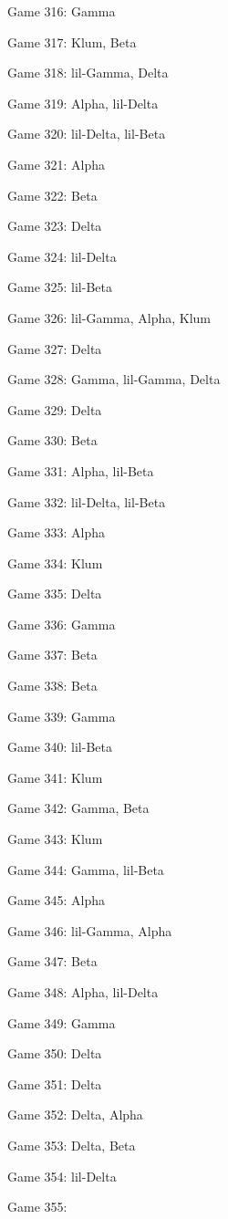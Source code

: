 \documentclass{article}
\begin{document}
\begin{multicols}{3}
\begin{compactitem}
\item Game 316:
Gamma
\item Game 317:
Klum, Beta
\item Game 318:
lil-Gamma, Delta
\item Game 319:
Alpha, lil-Delta
\item Game 320:
lil-Delta, lil-Beta
\item Game 321:
Alpha
\item Game 322:
Beta
\item Game 323:
Delta
\item Game 324:
lil-Delta
\item Game 325:
lil-Beta
\item Game 326:
lil-Gamma, Alpha, Klum
\item Game 327:
Delta
\item Game 328:
Gamma, lil-Gamma, Delta
\item Game 329:
Delta
\item Game 330:
Beta
\item Game 331:
Alpha, lil-Beta
\item Game 332:
lil-Delta, lil-Beta
\item Game 333:
Alpha
\item Game 334:
Klum
\item Game 335:
Delta
\item Game 336:
Gamma
\item Game 337:
Beta
\item Game 338:
Beta
\item Game 339:
Gamma
\item Game 340:
lil-Beta
\item Game 341:
Klum
\item Game 342:
Gamma, Beta
\item Game 343:
Klum
\item Game 344:
Gamma, lil-Beta
\item Game 345:
Alpha
\item Game 346:
lil-Gamma, Alpha
\item Game 347:
Beta
\item Game 348:
Alpha, lil-Delta
\item Game 349:
Gamma
\item Game 350:
Delta
\item Game 351:
Delta
\item Game 352:
Delta, Alpha
\item Game 353:
Delta, Beta
\item Game 354:
lil-Delta
\item Game 355:

\end{compactitem}
\end{multicols}
\end{document}
